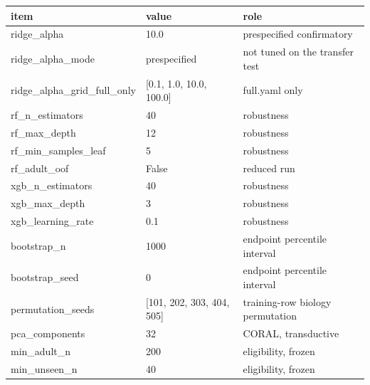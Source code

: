 \begin{tabular}{lll}
\hline
item & value & role \\
\hline
ridge\_alpha & 10.0 & prespecified confirmatory \\
ridge\_alpha\_mode & prespecified & not tuned on the transfer test \\
ridge\_alpha\_grid\_full\_only & [0.1, 1.0, 10.0, 100.0] & full.yaml only \\
rf\_n\_estimators & 40 & robustness \\
rf\_max\_depth & 12 & robustness \\
rf\_min\_samples\_leaf & 5 & robustness \\
rf\_adult\_oof & False & reduced run \\
xgb\_n\_estimators & 40 & robustness \\
xgb\_max\_depth & 3 & robustness \\
xgb\_learning\_rate & 0.1 & robustness \\
bootstrap\_n & 1000 & endpoint percentile interval \\
bootstrap\_seed & 0 & endpoint percentile interval \\
permutation\_seeds & [101, 202, 303, 404, 505] & training-row biology permutation \\
pca\_components & 32 & CORAL, transductive \\
min\_adult\_n & 200 & eligibility, frozen \\
min\_unseen\_n & 40 & eligibility, frozen \\
\hline
\end{tabular}
